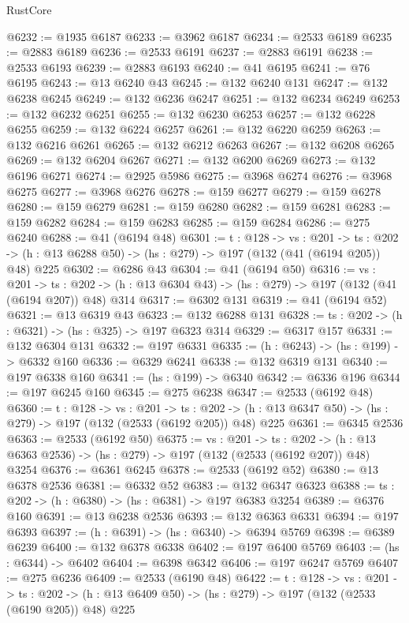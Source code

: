 \begin{lexlean}{RustCore}
\begin{coremodule}
@6232 := @1935 @6187
@6233 := @3962 @6187
@6234 := @2533 @6189
@6235 := @2883 @6189
@6236 := @2533 @6191
@6237 := @2883 @6191
@6238 := @2533 @6193
@6239 := @2883 @6193
@6240 := @41 @6195
@6241 := @76 @6195
@6243 := @13 @6240 @43
@6245 := @132 @6240 @131
@6247 := @132 @6238 @6245
@6249 := @132 @6236 @6247
@6251 := @132 @6234 @6249
@6253 := @132 @6232 @6251
@6255 := @132 @6230 @6253
@6257 := @132 @6228 @6255
@6259 := @132 @6224 @6257
@6261 := @132 @6220 @6259
@6263 := @132 @6216 @6261
@6265 := @132 @6212 @6263
@6267 := @132 @6208 @6265
@6269 := @132 @6204 @6267
@6271 := @132 @6200 @6269
@6273 := @132 @6196 @6271
@6274 := @2925 @5986
@6275 := @3968 @6274
@6276 := @3968 @6275
@6277 := @3968 @6276
@6278 := @159 @6277
@6279 := @159 @6278
@6280 := @159 @6279
@6281 := @159 @6280
@6282 := @159 @6281
@6283 := @159 @6282
@6284 := @159 @6283
@6285 := @159 @6284
@6286 := @275 @6240
@6288 := @41 (@6194 @48)
@6301 := {t : @128} ->
  {vs : @201} ->
  {ts : @202} -> (h : @13 @6288 @50) -> (hs : @279) -> @197 (@132 (@41 (@6194 @205)) @48) @225
@6302 := @6286 @43
@6304 := @41 (@6194 @50)
@6316 := {vs : @201} ->
  {ts : @202} -> (h : @13 @6304 @43) -> (hs : @279) -> @197 (@132 (@41 (@6194 @207)) @48) @314
@6317 := @6302 @131
@6319 := @41 (@6194 @52)
@6321 := @13 @6319 @43
@6323 := @132 @6288 @131
@6328 := {ts : @202} -> (h : @6321) -> (hs : @325) -> @197 @6323 @314
@6329 := @6317 @157
@6331 := @132 @6304 @131
@6332 := @197 @6331
@6335 := (h : @6243) -> (hs : @199) -> @6332 @160
@6336 := @6329 @6241
@6338 := @132 @6319 @131
@6340 := @197 @6338 @160
@6341 := (hs : @199) -> @6340
@6342 := @6336 @196
@6344 := @197 @6245 @160
@6345 := @275 @6238
@6347 := @2533 (@6192 @48)
@6360 := {t : @128} ->
  {vs : @201} ->
  {ts : @202} -> (h : @13 @6347 @50) -> (hs : @279) -> @197 (@132 (@2533 (@6192 @205)) @48) @225
@6361 := @6345 @2536
@6363 := @2533 (@6192 @50)
@6375 := {vs : @201} ->
  {ts : @202} -> (h : @13 @6363 @2536) -> (hs : @279) -> @197 (@132 (@2533 (@6192 @207)) @48) @3254
@6376 := @6361 @6245
@6378 := @2533 (@6192 @52)
@6380 := @13 @6378 @2536
@6381 := @6332 @52
@6383 := @132 @6347 @6323
@6388 := {ts : @202} -> (h : @6380) -> (hs : @6381) -> @197 @6383 @3254
@6389 := @6376 @160
@6391 := @13 @6238 @2536
@6393 := @132 @6363 @6331
@6394 := @197 @6393
@6397 := (h : @6391) -> (hs : @6340) -> @6394 @5769
@6398 := @6389 @6239
@6400 := @132 @6378 @6338
@6402 := @197 @6400 @5769
@6403 := (hs : @6344) -> @6402
@6404 := @6398 @6342
@6406 := @197 @6247 @5769
@6407 := @275 @6236
@6409 := @2533 (@6190 @48)
@6422 := {t : @128} ->
  {vs : @201} ->
  {ts : @202} -> (h : @13 @6409 @50) -> (hs : @279) -> @197 (@132 (@2533 (@6190 @205)) @48) @225

\end{coremodule}
\end{lexlean}
